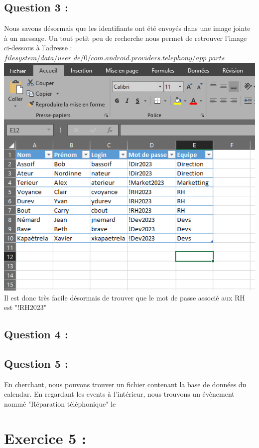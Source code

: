 \documentclass{article}
\begin{document}
    \subsection{Question 3 :}
        Nous savons désormais que les identifiants ont été envoyés dans une image jointe à un message.
        Un tout petit peu de recherche nous permet de retrouver l'image ci-dessous à l'adresse :\newline
        $filesystem/data/user\_de/0/com.android.providers.telephony/app\_parts$\newline
        \includegraphics[scale=0.5]{id.jpg}\newline
        Il est donc très facile désormais de trouver que le mot de passe associé aux RH est "!RH2023"
    \subsection{Question 4 :}

    \subsection{Question 5 :}
        En cherchant, nous pouvons trouver un fichier contenant la base de données du calendar.
        En regardant les events à l'intérieur, nous trouvons un évènement nommé "Réparation téléphonique" le

\section{Exercice 5 :}
\end{document}
